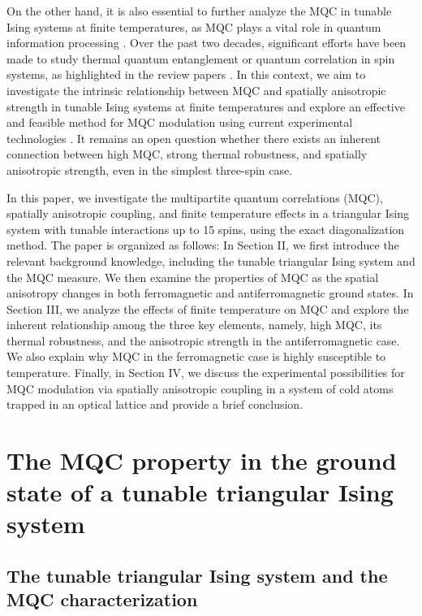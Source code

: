 \documentclass[pra,aps,twocolumn,showpacs]{revtex4}
\begin{document}
On the other hand, it is also essential to further analyze the MQC in tunable Ising systems at finite temperatures, as MQC plays a vital role in quantum information processing \cite{cory98prl,knill98prl,rauss01prl,datta08prl,lanyon08prl,ren21arxiv,monz09prl,lanyon09natp}. Over the past two decades, significant efforts have been made to study thermal quantum entanglement or quantum correlation in spin systems, as highlighted in the review papers \cite{amico08rmp,bera18rpp}. In this context, we aim to investigate the intrinsic relationship between MQC and spatially anisotropic strength in tunable Ising systems at finite temperatures and explore an effective and feasible method for MQC modulation using current experimental technologies \cite{kim10nat,Struck11sci,wang18natnano,niskanen07sci,Ryazanov01prb,Grosz11prb,Kosior13pra,Seo13prl}. It remains an open question whether there exists an inherent connection between high MQC, strong thermal robustness, and spatially anisotropic strength, even in the simplest three-spin case.

In this paper, we investigate the multipartite quantum correlations (MQC), spatially anisotropic coupling, and finite temperature effects in a triangular Ising system with tunable interactions up to 15 spins, using the exact diagonalization method. The paper is organized as follows: In Section II, we first introduce the relevant background knowledge, including the tunable triangular Ising system and the MQC measure. We then examine the properties of MQC as the spatial anisotropy changes in both ferromagnetic and antiferromagnetic ground states. In Section III, we analyze the effects of finite temperature on MQC and explore the inherent relationship among the three key elements, namely, high MQC, its thermal robustness, and the anisotropic strength in the antiferromagnetic case. We also explain why MQC in the ferromagnetic case is highly susceptible to temperature. Finally, in Section IV, we discuss the experimental possibilities for MQC modulation via spatially anisotropic coupling in a system of cold atoms trapped in an optical lattice and provide a brief conclusion.



\section{The MQC property in the ground state of a tunable triangular Ising system}

\subsection{The tunable triangular Ising system and the MQC characterization}
\end{document}
